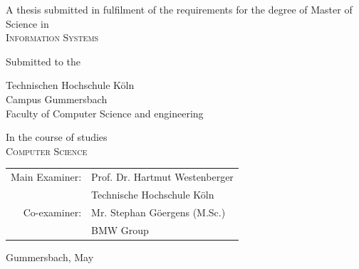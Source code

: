\begin{titlepage}
\begin{center}
\vspace{1.2cm}

\begin{large}
A thesis submitted in fulfilment of the requirements for the
degree of Master of Science in\\
\vspace{0.1cm}
\textsc{Information Systems}\\ 
\end{large}

\vspace{0.6cm}

\begin{large}
Submitted to the\\ 
\vspace{0.2cm}
\begin{scshape}
Technischen Hochschule Köln\\
Campus Gummersbach\\
Faculty of Computer Science and engineering\\
\end{scshape}
\end{large}

\vspace{0.6cm}

\begin{large}
In the course of studies\\ 
\vspace{0.1cm}
\textsc{Computer Science}
\end{large}


\vspace{1.2cm}

\begin{tabular}{rl}
        Main Examiner:  &  Prof. Dr. Hartmut Westenberger\\
       					&  \small Technische Hochschule Köln \\[1.0em]
       Co-examiner:  &  Mr. Stephan Göergens (M.Sc.)\\
       					&  \small BMW Group\\
\end{tabular}

\vspace{0.5cm}

\begin{large}
Gummersbach,  May \the\year
\end{large}


\end{center}
\end{titlepage}

